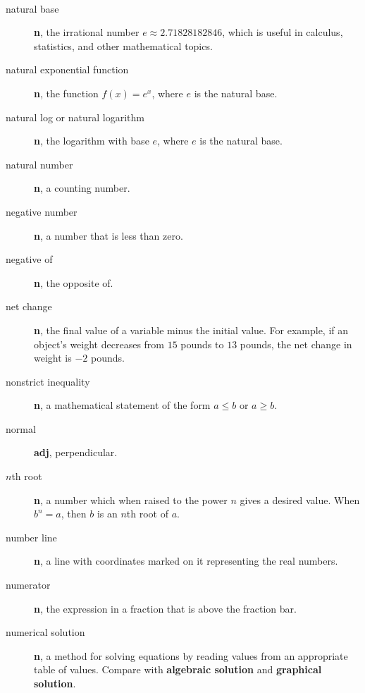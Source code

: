 \documentclass[10pt,]{book}
\newcommand{\terminology}[1]{\textbf{#1}}
\theoremstyle{plain}
\theoremstyle{definition}
\theoremstyle{definition}
\theoremstyle{definition}
\numberwithin{equation}{part}
\begin{document}
\paragraph[{}]{}\hypertarget{paragraphs-17}{}
\leavevmode%
\begin{description}
\item[{natural base}]\hypertarget{li-688}{}\terminology{n}, the irrational number \(e\approx 2.71828182846\), which is useful in calculus, statistics, and other mathematical topics.%
\item[{natural exponential function}]\hypertarget{li-689}{}\terminology{n}, the function \(f(x) = e^x\), where \(e\) is the natural base.%
\item[{natural log or natural logarithm}]\hypertarget{li-690}{}\terminology{n}, the logarithm with base \(e\), where \(e\) is the natural base.%
\item[{natural number}]\hypertarget{li-691}{}\terminology{n}, a counting number.%
\item[{negative number}]\hypertarget{li-692}{}\terminology{n}, a number that is less than zero.%
\item[{negative of}]\hypertarget{li-693}{}\terminology{n}, the opposite of.%
\item[{net change}]\hypertarget{li-694}{}\terminology{n}, the final value of a variable minus the initial value. For example, if an object's weight decreases from \(15\) pounds to \(13\) pounds, the net change in weight is \(-2\) pounds.%
\item[{nonstrict inequality}]\hypertarget{li-695}{}\terminology{n}, a mathematical statement of the form \(a \le b\) or \(a \ge b\).%
\item[{normal}]\hypertarget{li-696}{}\terminology{adj}, perpendicular.%
\item[{\(n\)th root}]\hypertarget{li-697}{}\terminology{n}, a number which when raised to the power \(n\) gives a desired value. When \(b^n = a\), then \(b\) is an \(n\)th root of \(a\).%
\item[{number line}]\hypertarget{li-698}{}\terminology{n}, a line with coordinates marked on it representing the real numbers.%
\item[{numerator}]\hypertarget{li-699}{}\terminology{n}, the expression in a fraction that is above the fraction bar.%
\item[{numerical solution}]\hypertarget{li-700}{}\terminology{n}, a method for solving equations by reading values from an appropriate table of values. Compare with \terminology{algebraic solution} and \terminology{graphical solution}.%
\end{description}
%
\typeout{************************************************}
\typeout{************************************************}
\end{document}
